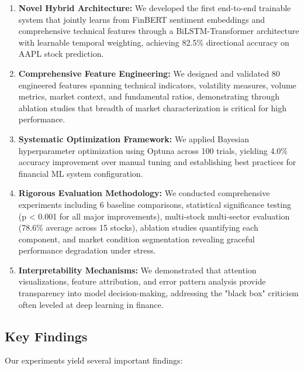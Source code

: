 \documentclass[conference]{IEEEtran}
\begin{document}
\begin{enumerate}
\item \textbf{Novel Hybrid Architecture:} We developed the first end-to-end trainable system that jointly learns from FinBERT sentiment embeddings and comprehensive technical features through a BiLSTM-Transformer architecture with learnable temporal weighting, achieving 82.5\% directional accuracy on AAPL stock prediction.

\item \textbf{Comprehensive Feature Engineering:} We designed and validated 80 engineered features spanning technical indicators, volatility measures, volume metrics, market context, and fundamental ratios, demonstrating through ablation studies that breadth of market characterization is critical for high performance.

\item \textbf{Systematic Optimization Framework:} We applied Bayesian hyperparameter optimization using Optuna across 100 trials, yielding 4.0\% accuracy improvement over manual tuning and establishing best practices for financial ML system configuration.

\item \textbf{Rigorous Evaluation Methodology:} We conducted comprehensive experiments including 6 baseline comparisons, statistical significance testing (p < 0.001 for all major improvements), multi-stock multi-sector evaluation (78.6\% average across 15 stocks), ablation studies quantifying each component, and market condition segmentation revealing graceful performance degradation under stress.

\item \textbf{Interpretability Mechanisms:} We demonstrated that attention visualizations, feature attribution, and error pattern analysis provide transparency into model decision-making, addressing the "black box" criticism often leveled at deep learning in finance.
\end{enumerate}

\subsection{Key Findings}

Our experiments yield several important findings:
\end{document}

